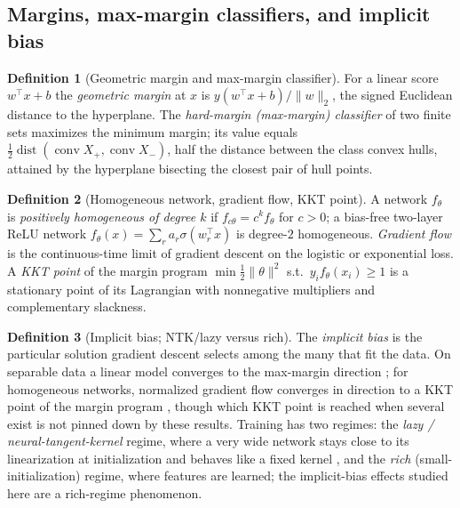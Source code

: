 \documentclass[11pt]{article}
\theoremstyle{plain}
\theoremstyle{definition}
\newtheorem{definition}{Definition}
\theoremstyle{remark}
\newcommand{\conv}{\operatorname{conv}}
\begin{document}
\subsection{Margins, max-margin classifiers, and implicit bias}\label{sec:background-margin}
\begin{definition}[Geometric margin and max-margin classifier]
For a linear score $w^\top x+b$ the \emph{geometric margin} at $x$ is $y(w^\top x+b)/\|w\|_2$, the signed Euclidean distance to the hyperplane.  The \emph{hard-margin (max-margin) classifier} of two finite sets maximizes the minimum margin; its value equals $\tfrac12\operatorname{dist}(\conv X_+,\conv X_-)$, half the distance between the class convex hulls, attained by the hyperplane bisecting the closest pair of hull points.
\end{definition}

\begin{definition}[Homogeneous network, gradient flow, KKT point]\label{def:homog}
A network $f_\theta$ is \emph{positively homogeneous of degree $k$} if $f_{c\theta}=c^k f_\theta$ for $c>0$; a bias-free two-layer ReLU network $f_\theta(x)=\sum_r a_r\sigma(w_r^\top x)$ is degree-$2$ homogeneous.  \emph{Gradient flow} is the continuous-time limit of gradient descent on the logistic or exponential loss.  A \emph{KKT point} of the margin program $\min\tfrac12\|\theta\|^2$ s.t.\ $y_if_\theta(x_i)\ge1$ is a stationary point of its Lagrangian with nonnegative multipliers and complementary slackness.
\end{definition}

\begin{definition}[Implicit bias; NTK/lazy versus rich]\label{def:implicit}
The \emph{implicit bias} is the particular solution gradient descent selects among the many that fit the data.  On separable data a linear model converges to the max-margin direction \citep{Soudry2018}; for homogeneous networks, normalized gradient flow converges in direction to a KKT point of the margin program \citep{Lyu2020,Ji2020}, though which KKT point is reached when several exist is not pinned down by these results.  Training has two regimes: the \emph{lazy / neural-tangent-kernel} regime, where a very wide network stays close to its linearization at initialization and behaves like a fixed kernel \citep{Jacot2018,Chizat2018}, and the \emph{rich} (small-initialization) regime, where features are learned; the implicit-bias effects studied here are a rich-regime phenomenon.
\end{definition}
\end{document}
